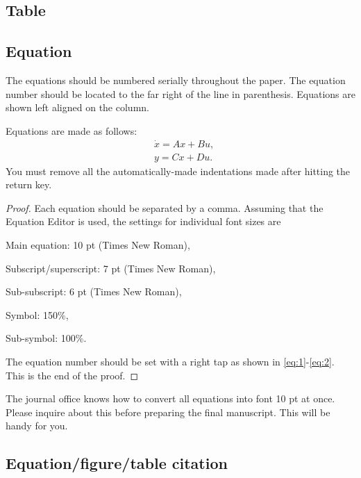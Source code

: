 \documentclass{IJCAS}
\begin{document}
\subsection{Table}
\newpage





\subsection{Equation}

The equations should be numbered serially throughout the paper. The equation number should be located to the far right of the line in parenthesis. Equations are shown left aligned on the column.

\begin{theorem}
Equations are made as follows:
\begin{align} 
&\label{eq:1} 
\dot{x}=Ax+Bu, \\
&\label{eq:2} 
y=Cx+Du. 
\end{align} 
You must remove all the automatically-made indentations made after hitting the return key. 
\end{theorem}
\begin{proof}
Each equation should be separated by a comma. Assuming that the Equation Editor is used, the settings for individual font sizes are

Main equation: 10 pt (Times New Roman),

Subscript/superscript: 7 pt (Times New Roman),

Sub-subscript: 6 pt (Times New Roman),

Symbol: 150\%,

Sub-symbol: 100\%. 

The equation number should be set with a right tap as shown in \eqref{eq:1}-\eqref{eq:2}. This is the end of the proof.
\end{proof}



\begin{remark}
The journal office knows how to convert all equations into font 10 pt at once. Please inquire about this before preparing the final manuscript. This will be handy for you.
\end{remark}



\subsection{Equation/figure/table citation}
\end{document}
